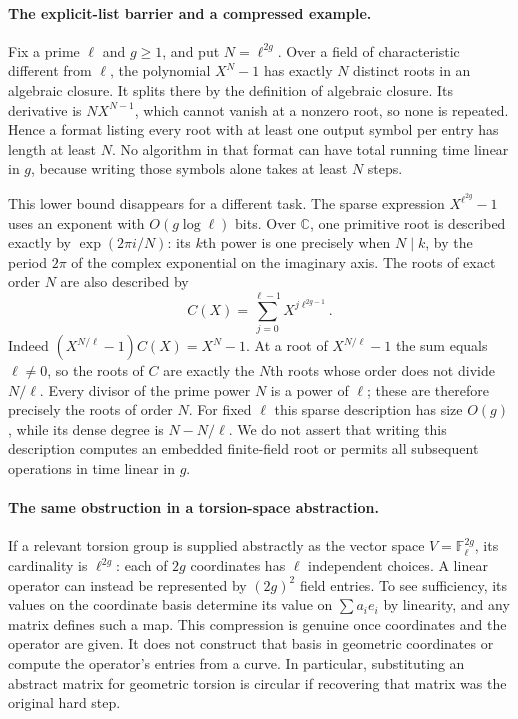 \documentclass[11pt]{article}
\begin{document}
\paragraph{The explicit-list barrier and a compressed example.}
Fix a prime $\ell$ and $g\ge1$, and put $N=\ell^{2g}$.
Over a field of characteristic different from $\ell$, the polynomial
$X^N-1$ has exactly $N$ distinct roots in an algebraic closure.
It splits there by the definition of algebraic closure. Its derivative
is $NX^{N-1}$, which cannot vanish at a nonzero root, so none is
repeated. Hence a format listing every root with at least one output
symbol per entry has length at least $N$. No algorithm in that format
can have total running time linear in $g$, because writing those
symbols alone takes at least $N$ steps.

This lower bound disappears for a different task. The sparse expression
$X^{\ell^{2g}}-1$ uses an exponent with $O(g\log\ell)$ bits.
Over $\mathbb C$, one primitive root is described exactly by
$\exp(2\pi i/N)$: its $k$th power is one precisely when $N\mid k$,
by the period $2\pi$ of the complex exponential on the imaginary axis.
The roots of exact order $N$ are also described by
\[
C(X)=\sum_{j=0}^{\ell-1}X^{j\ell^{2g-1}}.
\]
Indeed $(X^{N/\ell}-1)C(X)=X^N-1$. At a root of
$X^{N/\ell}-1$ the sum equals $\ell\ne0$, so the roots of $C$
are exactly the $N$th roots whose order does not divide $N/\ell$.
Every divisor of the prime power $N$ is a power of $\ell$;
these are therefore precisely the roots of order $N$.
For fixed $\ell$ this sparse description has size $O(g)$, while
its dense degree is $N-N/\ell$. We do not assert that writing
this description computes an embedded finite-field root or permits
all subsequent operations in time linear in $g$.

\paragraph{The same obstruction in a torsion-space abstraction.}
If a relevant torsion group is supplied abstractly as the vector space
$V=\mathbb F_\ell^{2g}$, its cardinality is $\ell^{2g}$:
each of $2g$ coordinates has $\ell$ independent choices.
A linear operator can instead be represented by $(2g)^2$ field
entries. To see sufficiency, its values on the coordinate basis
determine its value on $\sum a_ie_i$ by linearity, and any matrix
defines such a map. This compression is genuine once coordinates
and the operator are given. It does not construct that basis in
geometric coordinates or compute the operator's entries from a curve.
In particular, substituting an abstract matrix for geometric torsion
is circular if recovering that matrix was the original hard step.
\end{document}
